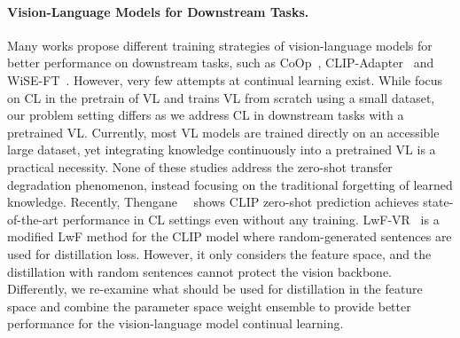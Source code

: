 \paragraph{Vision-Language Models for Downstream Tasks.}
Many works propose different training strategies of vision-language models for better performance on downstream tasks, such as CoOp~\cite{zhou2022learning}, CLIP-Adapter~\cite{gao2021clip} and WiSE-FT~\cite{wortsman2022robust}. However, very few attempts at continual learning exist. While \cite{srinivasan2022climb,wang2022continual} focus on CL in the pretrain of VL and \cite{ni2023continual} trains VL from scratch using a small dataset, our problem setting differs as we address CL in downstream tasks with a pretrained VL. Currently, most VL models are trained directly on an accessible large dataset, yet integrating knowledge continuously into a pretrained VL is a practical necessity. None of these studies address the zero-shot transfer degradation phenomenon, instead focusing on the traditional forgetting of learned knowledge. Recently, Thengane~\etal~\cite{thengane2022clip} shows CLIP zero-shot prediction achieves state-of-the-art performance in CL settings even without any training. LwF-VR~\cite{ding2022don} is a modified LwF method for the CLIP model where random-generated sentences are used for distillation loss. However, it only considers the feature space, and the distillation with random sentences cannot protect the vision backbone. Differently, we re-examine what should be used for distillation in the feature space and combine the parameter space weight ensemble to provide better performance for the vision-language model continual learning.